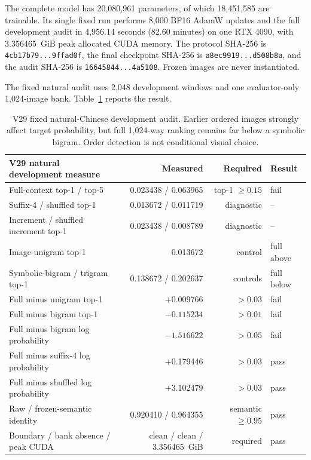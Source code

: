 \documentclass[11pt]{article}
\begin{document}
The complete model has 20,080,961 parameters, of which 18,451,585 are
trainable. Its single fixed run performs 8,000 BF16 AdamW updates and the full
development audit in 4,956.14 seconds (82.60 minutes) on one RTX 4090, with
3.356465~GiB peak allocated CUDA memory. The protocol SHA-256 is
\texttt{4cb17b79...9ffad0f}, the final checkpoint SHA-256 is
\texttt{a8ec9919...d508b8a}, and the audit SHA-256 is
\texttt{16645844...4a5108}. Frozen images are never instantiated.

The fixed natural audit uses 2,048 development windows and one evaluator-only
1,024-image bank. Table~\ref{tab:v29natural} reports the result.

\begin{table}[h!]
\centering
\small
\begin{tabular}{lrrl}
\toprule
V29 natural development measure & Measured & Required & Result \\
\midrule
Full-context top-1 / top-5 & 0.023438 / 0.063965 & top-1 $\geq0.15$ & fail \\
Suffix-4 / shuffled top-1 & 0.013672 / 0.011719 & diagnostic & -- \\
Increment / shuffled increment top-1 & 0.023438 / 0.008789 & diagnostic & -- \\
Image-unigram top-1 & 0.013672 & control & full above \\
Symbolic-bigram / trigram top-1 & 0.138672 / 0.202637 & controls & full below \\
Full minus unigram top-1 & +0.009766 & $>0.03$ & fail \\
Full minus bigram top-1 & $-0.115234$ & $>0.01$ & fail \\
Full minus bigram log probability & $-1.516622$ & $>0.05$ & fail \\
Full minus suffix-4 log probability & +0.179446 & $>0.03$ & pass \\
Full minus shuffled log probability & +3.102479 & $>0.03$ & pass \\
Raw / frozen-semantic identity & 0.920410 / 0.964355 & semantic $\geq0.95$ & pass \\
Boundary / bank absence / peak CUDA & clean / clean / 3.356465~GiB & required & pass \\
\bottomrule
\end{tabular}
\caption{V29 fixed natural-Chinese development audit. Earlier ordered images
strongly affect target probability, but full 1,024-way ranking remains far
below a symbolic bigram. Order detection is not conditional visual choice.}
\label{tab:v29natural}
\end{table}
\end{document}
